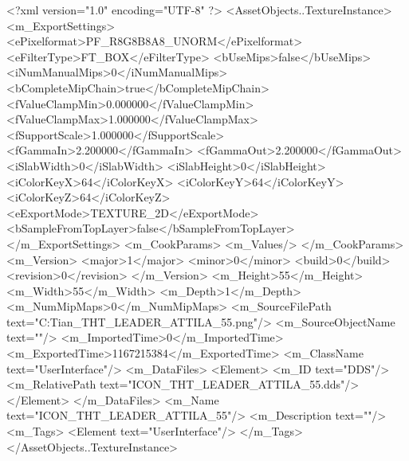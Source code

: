 <?xml version="1.0" encoding="UTF-8" ?>
<AssetObjects..TextureInstance>
	<m_ExportSettings>
		<ePixelformat>PF_R8G8B8A8_UNORM</ePixelformat>
		<eFilterType>FT_BOX</eFilterType>
		<bUseMips>false</bUseMips>
		<iNumManualMips>0</iNumManualMips>
		<bCompleteMipChain>true</bCompleteMipChain>
		<fValueClampMin>0.000000</fValueClampMin>
		<fValueClampMax>1.000000</fValueClampMax>
		<fSupportScale>1.000000</fSupportScale>
		<fGammaIn>2.200000</fGammaIn>
		<fGammaOut>2.200000</fGammaOut>
		<iSlabWidth>0</iSlabWidth>
		<iSlabHeight>0</iSlabHeight>
		<iColorKeyX>64</iColorKeyX>
		<iColorKeyY>64</iColorKeyY>
		<iColorKeyZ>64</iColorKeyZ>
		<eExportMode>TEXTURE_2D</eExportMode>
		<bSampleFromTopLayer>false</bSampleFromTopLayer>
	</m_ExportSettings>
	<m_CookParams>
		<m_Values/>
	</m_CookParams>
	<m_Version>
		<major>1</major>
		<minor>0</minor>
		<build>0</build>
		<revision>0</revision>
	</m_Version>
	<m_Height>55</m_Height>
	<m_Width>55</m_Width>
	<m_Depth>1</m_Depth>
	<m_NumMipMaps>0</m_NumMipMaps>
	<m_SourceFilePath text="C:\Users\Troy Tian\Downloads\ICON_THT_LEADER_ATTILA_55.png"/>
	<m_SourceObjectName text=""/>
	<m_ImportedTime>0</m_ImportedTime>
	<m_ExportedTime>1167215384</m_ExportedTime>
	<m_ClassName text="UserInterface"/>
	<m_DataFiles>
		<Element>
			<m_ID text="DDS"/>
			<m_RelativePath text="ICON_THT_LEADER_ATTILA_55.dds"/>
		</Element>
	</m_DataFiles>
	<m_Name text="ICON_THT_LEADER_ATTILA_55"/>
	<m_Description text=""/>
	<m_Tags>
		<Element text="UserInterface"/>
	</m_Tags>
</AssetObjects..TextureInstance>

